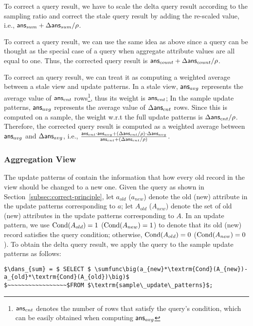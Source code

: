To correct a \sumfunc query result, we have to scale the delta query result according to the sampling ratio and correct the stale query result by adding the re-scaled value, i.e., $\textsf{ans}_{sum}+\Delta\textsf{ans}_{sum}/\rho $. 

To correct a \countfunc query result, we can use the same idea as above since a \countfunc query can be thought as the special case of a \sumfunc query when aggregate attribute values are all equal to one. Thus, the corrected \countfunc query result is $\textsf{ans}_{count}+\Delta\textsf{ans}_{count}/\rho $.

To correct an \avgfunc query result, we can treat it as computing a weighted average between a stale view and update patterns. In a stale view, $\textsf{ans}_{avg}$ represents the average value of $\textsf{ans}_{cnt}$ rows\footnote{\small $\textsf{ans}_{cnt}$ denotes the number of rows that satisfy the \avgfunc query's condition, which can be easily obtained when computing $\textsf{ans}_{avg}$}, thus its weight is $\textsf{ans}_{cnt}$; In the sample update patterns, $\textsf{ans}_{avg}$ represents the average value of $\Delta\textsf{ans}_{cnt}$ rows. Since this is computed on a sample, the weight w.r.t the full update patterns is  $\Delta\textsf{ans}_{cnt}/\rho $. Therefore, the corrected \avgfunc query result is computed as a weighted average between $\textsf{ans}_{avg}$ and $\Delta\textsf{ans}_{avg}$, i.e., $\frac{\textsf{ans}_{cnt}\cdot\textsf{ans}_{avg}+(\Delta\textsf{ans}_{cnt}/\rho )\cdot\Delta\textsf{ans}_{avg}}{\textsf{ans}_{cnt}+(\Delta\textsf{ans}_{cnt}/\rho )}$.




\subsubsection{Aggregation View}\label{subsubsec:correct-agg}

\sloppy

The update patterns of \aggview contain the information that how every old record in the view should be changed to a new one. Given the query as shown in Section~\ref{subsec:correct-principle}, let $a_{old}$ ($a_{new}$) denote the old (new) attribute in the update patterns corresponding to $a$; let $A_{old}$ ($A_{new}$) denote the set of old (new) attributes in the update patterns corresponding to $A$.
In an update pattern, we use $\textrm{Cond}(A_{old})=1$ ($\textrm{Cond}(A_{new})=1$) to denote that its old (new) record satisfies the query condition; otherwise, $\textrm{Cond}({A_{old}})=0$ ($\textrm{Cond}({A_{new}})=0$). 
To obtain the delta query result, we apply the query to the sample update patterns as follows:

\fussy

\begin{lstlisting}[mathescape,basicstyle={\scriptsize}]
$\dans_{sum} = $ SELECT $ \sumfunc\big(a_{new}*\textrm{Cond}(A_{new})-a_{old}*\textrm{Cond}(A_{old})\big)$ 
$~~~~~~~~~~~~~~~~~$FROM $\textrm{sample\_update\_patterns}$;
\end{lstlisting}

